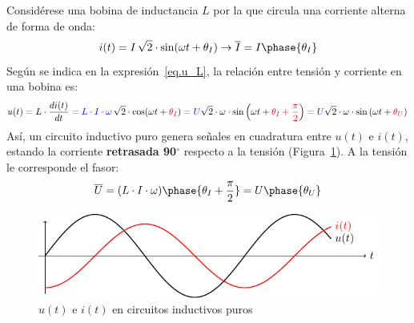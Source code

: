 Considérese una bobina de inductancia $L$ por la que circula una
corriente alterna de forma de onda:
\begin{equation*}
  i(t)=I\,\sqrt{2}\cdot\sin(\omega t+\theta_I)\rightarrow\overline{I}=I\phase{\theta_I}
\end{equation*}
Según se indica en la expresión~\eqref{eq.u_L}, la relación entre
tensión y corriente en una bobina es:
\begin{equation*}
  u(t)=L\cdot\dfrac{di(t)}{dt}={\color{blue}L\cdot I \cdot \omega}\,\sqrt{2}\cdot  \cos(\omega t+{\color{red}\theta_I})= {\color{blue} U} \sqrt{2}\cdot \omega\cdot  \sin \left(\omega t+{\color{red}\theta_I+\frac{\pi}{2}}\right)= {\color{blue} U} \sqrt{2}\cdot \omega\cdot  \sin \left(\omega t+{\color{red}\theta_U}\right)\,
\end{equation*}
Así, un circuito inductivo puro genera señales en cuadratura entre
$u(t)$ e $i(t)$, estando la corriente \textbf{retrasada 90$^\circ$}
respecto a la tensión (Figura~\ref{fig.inductivoPuro}). A la tensión
le corresponde el fasor:
\begin{equation*}
  \overline{U}=(L\cdot I\cdot\omega)\phase{\theta_I+\frac{\pi}{2}}=U\phase{\theta_U}
\end{equation*}
\begin{figure}[H]
  \centering \includegraphics{../figs/inductivoPuro.pdf}
  \caption{$u(t)$ e $i(t)$ en circuitos inductivos puros}
  \label{fig.inductivoPuro}
\end{figure}
	
